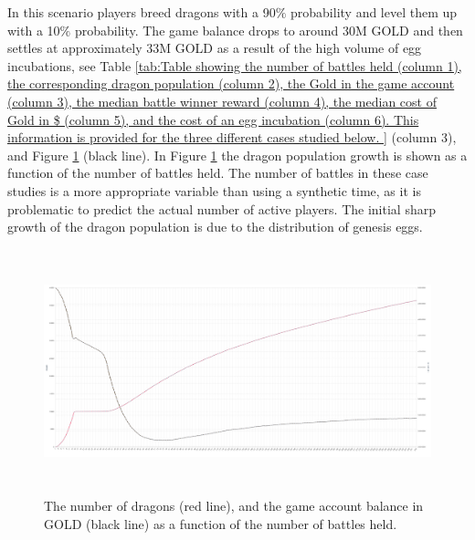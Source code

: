 \documentclass[12pt]{article}
\begin{document}
{In this scenario players breed dragons with a 90$\%$  probability and level them up with a 10$\%$  probability. The game balance drops to around 30M GOLD and then settles at approximately 33M GOLD as a result of the high volume of egg incubations, see  Table \ref{tab:Table showing the number of battles held (column 1), the corresponding dragon population (column 2), the Gold in the game account (column 3), the median battle winner reward (column 4), the median cost of Gold in $ (column 5), and the cost of an egg incubation (column 6).  This information is provided for the three different cases studied below. } (column 3), and Figure \ref{fig:The number of dragons (red line) as a function of the number of battles held, and the game account balance in GOLD (black line)} (black line). In Figure \ref{fig:The number of dragons (red line) as a function of the number of battles held, and the game account balance in GOLD (black line)} the dragon population growth is shown as a function of the number of battles held. The number of battles in these case studies is a more appropriate variable than using a synthetic time, as it is problematic to predict the actual number of active players. The initial sharp growth of the dragon population is due to the distribution of genesis eggs.\par




\begin{figure}[H]
	\begin{Center}
		\includegraphics[width=6.27in,height=2.79in]{./media/CS1nimage21.png}
		\caption{The number of dragons (red line), and the game account balance in GOLD (black line)  as a function of the number of battles held.}
		\label{fig:The number of dragons (red line) as a function of the number of battles held, and the game account balance in GOLD (black line)}
	\end{Center}
\end{figure}


}
\end{document}
